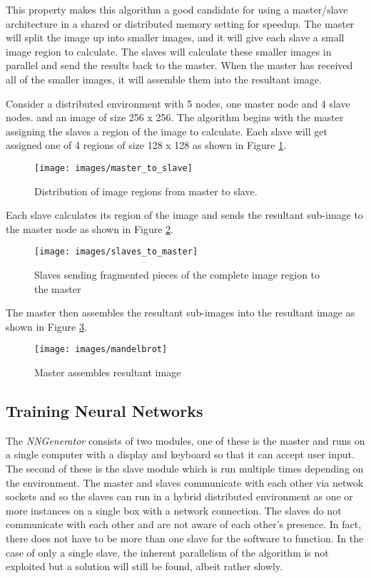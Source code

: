 This property makes this algorithm a good candidate for using a master/slave architecture in a shared or distributed memory setting for speedup. 
The master will split the image up into smaller images, and it will give each slave a small image region to calculate. 
The slaves will calculate these smaller images in parallel and send the results back to the master. 
When the master has received all of the smaller images, it will assemble them into the resultant image.

Consider a distributed environment with 5 nodes, one master node and 4 slave nodes. and an image of size 256 x 256. 
The algorithm begins with the master assigning the slaves a region of the image to calculate. 
Each slave will get assigned one of 4 regions of size 128 x 128 as shown in Figure \ref{m2s}.

\begin{figure}[h!]
  \centering
  \texttt{[image: images/master\_to\_slave]}
  \caption{Distribution of image regions from master to slave.}
  \label{m2s}
\end{figure}

Each slave calculates its region of the image and sends the resultant sub-image to the master node as shown in Figure \ref{s2m}.

\begin{figure}[h!]
  \centering
  \texttt{[image: images/slaves\_to\_master]}
  \caption{Slaves sending fragmented pieces of the complete image region to the master}
  \label{s2m}
\end{figure}

The master then assembles the resultant sub-images into the resultant image as shown in Figure \ref{resultant_image}. 

\begin{figure}[h!]
  \centering
  \texttt{[image: images/mandelbrot]}
  \caption{Master assembles resultant image}
  \label{resultant_image}
\end{figure}

\subsection{Training Neural Networks}
The {\em NNGenerator} consists of two modules, one of these is the master and runs on a single computer with a display and keyboard so that it can accept user input.
The second of these is the slave module which is run multiple times depending on the environment.
The master and slaves communicate with each other via netwok sockets and so the slaves can run in a hybrid distributed environment as one or more instances on a single box with a network connection.
The slaves do not communicate with each other and are not aware of each other's presence.
In fact, there does not have to be more than one slave for the software to function.
In the case of only a single slave, the inherent parallelism of the algorithm is not exploited but a solution will still be found, albeit rather slowly.

